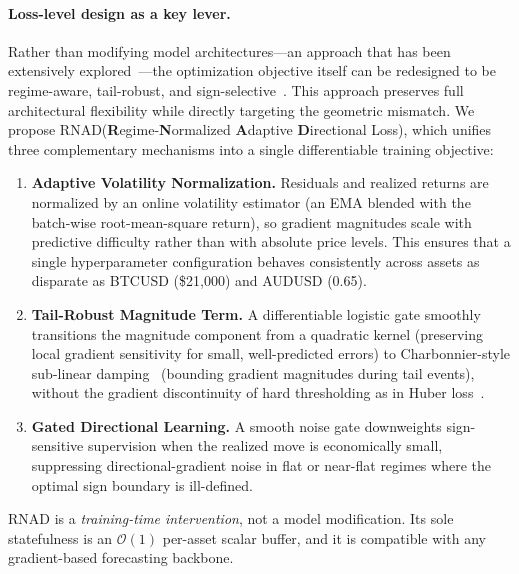 \documentclass[11pt]{article}
\newcommand{\RNAD}{RNAD\xspace}
\begin{document}
\paragraph{Loss-level design as a key lever.}
Rather than modifying model architectures---an approach that has been
extensively explored~\citep{vaswani2017attention,patchtst,
itransformer,challu2023nhits,zeng2023dlinear}---the optimization
objective itself can be redesigned to be regime-aware, tail-robust,
and sign-selective~\citep{barron2019general}. This approach preserves
full architectural flexibility while directly targeting the geometric
mismatch. We propose \RNAD (\textbf{R}egime-\textbf{N}ormalized
\textbf{A}daptive \textbf{D}irectional Loss), which unifies three
complementary mechanisms into a single differentiable training
objective:

\begin{enumerate}
\item \textbf{Adaptive Volatility Normalization.} Residuals and
  realized returns are normalized by an online volatility estimator
  (an EMA blended with the batch-wise root-mean-square return), so
  gradient magnitudes scale with predictive difficulty rather than
  with absolute price levels. This ensures that a single
  hyperparameter configuration behaves consistently across assets as
  disparate as BTCUSD (\$21{,}000) and AUDUSD (0.65).

\item \textbf{Tail-Robust Magnitude Term.} A differentiable logistic
  gate smoothly transitions the magnitude component from a quadratic
  kernel (preserving local gradient sensitivity for small,
  well-predicted errors) to Charbonnier-style sub-linear
  damping~\citep{charbonnier1994deterministic} (bounding gradient
  magnitudes during tail events), without the gradient discontinuity
  of hard thresholding as in Huber loss~\citep{huber1964robust}.

\item \textbf{Gated Directional Learning.} A smooth noise gate
  downweights sign-sensitive supervision when the realized move is
  economically small, suppressing directional-gradient noise in flat
  or near-flat regimes where the optimal sign boundary is ill-defined.
\end{enumerate}

\RNAD is a \emph{training-time intervention}, not a model modification.
Its sole statefulness is an $\mathcal{O}(1)$ per-asset scalar buffer,
and it is compatible with any gradient-based forecasting backbone.
\end{document}
